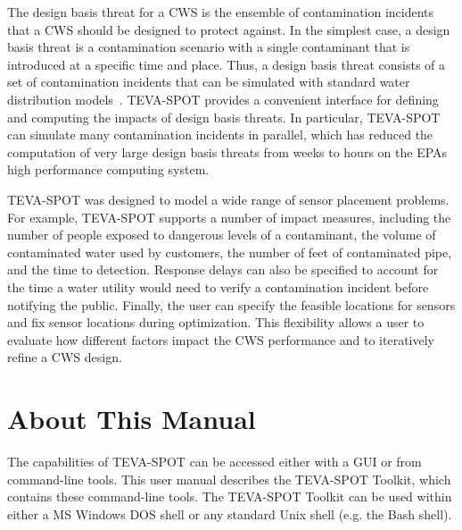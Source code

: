 The design basis threat for a CWS is the ensemble of contamination incidents that a CWS should be designed to protect against. In the simplest case, a design basis threat is a contamination scenario with a single contaminant that is introduced at a specific time and place. Thus, a design basis threat consists of a set of contamination incidents that can be simulated with standard water distribution   models~\cite{EPANET}.  TEVA-\/SPOT provides a convenient interface for defining and computing the impacts of design basis threats. In particular, TEVA-\/SPOT can simulate many contamination incidents in parallel, which has reduced the computation of very large design basis threats from weeks to hours on the EPAs high performance computing system.

TEVA-\/SPOT was designed to model a wide range of sensor placement problems. For example, TEVA-\/SPOT supports a number of impact measures, including the number of people exposed to dangerous levels of a contaminant, the volume of contaminated water used by customers, the number of feet of contaminated pipe, and the time to detection. Response delays can also be specified to account for the time a water utility would need to verify a contamination incident before notifying the public. Finally, the user can specify the feasible locations for sensors and fix sensor locations during optimization. This flexibility allows a user to evaluate how different factors impact the CWS performance and to iteratively refine a CWS design.

\section{About This Manual}\label{intro_introAbout}
The capabilities of TEVA-\/SPOT can be accessed either with a GUI or from command-\/line tools. This user manual describes the TEVA-\/SPOT Toolkit, which contains these command-\/line tools. The TEVA-\/SPOT Toolkit can be used within either a MS Windows DOS shell or any standard Unix shell (e.g. the Bash shell).

